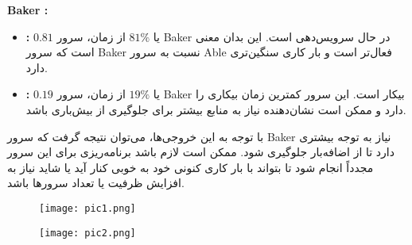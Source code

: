 \textbf{Baker :}
\begin{itemize}
	\item \textbf{ :} \(0.81\) یا \(81\%\) از زمان، سرور Baker در حال سرویس‌دهی است. این بدان معنی است که سرور Baker نسبت به سرور Able فعال‌تر است و بار کاری سنگین‌تری دارد.
	\item \textbf{ :} \(0.19\) یا \(19\%\) از زمان، سرور Baker بیکار است. این سرور کمترین زمان بیکاری را دارد و ممکن است نشان‌دهنده نیاز به منابع بیشتر برای جلوگیری از بیش‌باری باشد.
\end{itemize}

با توجه به این خروجی‌ها، می‌توان نتیجه گرفت که سرور Baker نیاز به توجه بیشتری دارد تا از اضافه‌بار جلوگیری شود. ممکن است لازم باشد برنامه‌ریزی برای این سرور مجدداً انجام شود تا بتواند با بار کاری کنونی خود به خوبی کنار آید یا شاید نیاز به افزایش ظرفیت یا تعداد سرورها باشد.

\begin{figure}[h]
	\centering
	\texttt{[image: pic1.png]}
	\label{fig:label4}
\end{figure}

\begin{figure}[h]
	\centering
	\texttt{[image: pic2.png]}
	\label{fig:label4}
\end{figure}